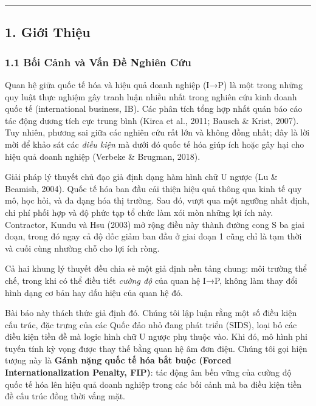 \documentclass[12pt,a4paper]{article}
\begin{document}
\begin{center}\rule{0.5\linewidth}{0.5pt}\end{center}

\hypertarget{1-giux1edbi-thiux1ec7u}{%
\subsection{1. Giới Thiệu}\label{1-giux1edbi-thiux1ec7u}}

\hypertarget{11-bux1ed1i-cux1ea3nh-vuxe0-vux1ea5n-ux111ux1ec1-nghiuxean-cux1ee9u}{%
\subsubsection{1.1 Bối Cảnh và Vấn Đề Nghiên
Cứu}\label{11-bux1ed1i-cux1ea3nh-vuxe0-vux1ea5n-ux111ux1ec1-nghiuxean-cux1ee9u}}

Quan hệ giữa quốc tế hóa và hiệu quả doanh nghiệp (I→P) là một trong
những quy luật thực nghiệm gây tranh luận nhiều nhất trong nghiên cứu
kinh doanh quốc tế (international business, IB). Các phân tích tổng hợp
nhất quán báo cáo tác động dương tích cực trung bình (Kirca et al.,
2011; Bausch \& Krist, 2007). Tuy nhiên, phương sai giữa các nghiên cứu
rất lớn và không đồng nhất; đây là lời mời để khảo sát các \emph{điều
kiện} mà dưới đó quốc tế hóa giúp ích hoặc gây hại cho hiệu quả doanh
nghiệp (Verbeke \& Brugman, 2018).

Giải pháp lý thuyết chủ đạo giả định dạng hàm hình chữ U ngược (Lu \&
Beamish, 2004). Quốc tế hóa ban đầu cải thiện hiệu quả thông qua kinh tế
quy mô, học hỏi, và đa dạng hóa thị trường. Sau đó, vượt qua một ngưỡng
nhất định, chi phí phối hợp và độ phức tạp tổ chức làm xói mòn những lợi
ích này. Contractor, Kundu và Hsu (2003) mở rộng điều này thành đường
cong S ba giai đoạn, trong đó ngay cả độ dốc giảm ban đầu ở giai đoạn 1
cũng chỉ là tạm thời và cuối cùng nhường chỗ cho lợi ích ròng.

Cả hai khung lý thuyết đều chia sẻ một giả định nền tảng chung: môi
trường thể chế, trong khi có thể điều tiết \emph{cường độ} của quan hệ
I→P, không làm thay đổi hình dạng cơ bản hay dấu hiệu của quan hệ đó.

Bài báo này thách thức giả định đó. Chúng tôi lập luận rằng một số điều
kiện cấu trúc, đặc trưng của các Quốc đảo nhỏ đang phát triển (SIDS),
loại bỏ các điều kiện tiền đề mà logic hình chữ U ngược phụ thuộc vào.
Khi đó, mô hình phi tuyến tính kỳ vọng được thay thế bằng quan hệ âm đơn
điệu. Chúng tôi gọi hiện tượng này là \textbf{Gánh nặng quốc tế hóa bắt
buộc (Forced Internationalization Penalty, FIP)}: tác động âm bền vững
của cường độ quốc tế hóa lên hiệu quả doanh nghiệp trong các bối cảnh mà
ba điều kiện tiền đề cấu trúc đồng thời vắng mặt.
\end{document}
